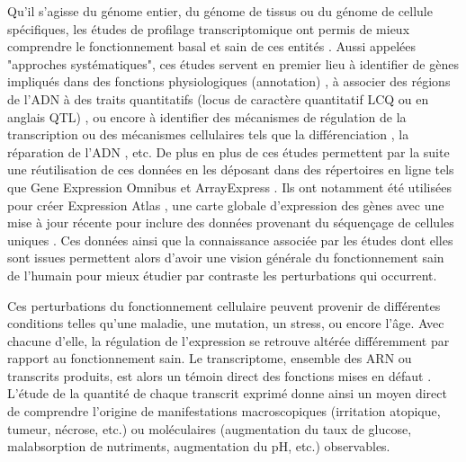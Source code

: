 Qu'il s'agisse du génome entier, du génome de tissus ou du génome de cellule spécifiques, les études de profilage transcriptomique ont permis de mieux comprendre le fonctionnement basal et sain de ces entités \cite{Hughes2000, Cloonan2008Jul}. Aussi appelées "approches systématiques", ces études servent en premier lieu à identifier de gènes impliqués dans des fonctions physiologiques (annotation) \cite{Munji2019Nov}, à associer des régions de l'ADN à des traits quantitatifs (locus de caractère quantitatif LCQ ou en anglais QTL) \cite{Sarkar2019Apr}, ou encore à identifier des mécanismes de régulation de la transcription \cite{Segales2016Dec} ou des mécanismes cellulaires tels que la différenciation \cite{Godoy2018Jul}, la réparation de l'ADN \cite{Jividen2018Dec}, etc. De plus en plus de ces études permettent par la suite une réutilisation de ces données en les déposant dans des répertoires en ligne tels que Gene Expression Omnibus \cite{Barrett2013Jan} et ArrayExpress \cite{Athar2019Jan}. Ils ont notamment été utilisées pour créer Expression Atlas \cite{Lukk2010Apr}, une carte globale d'expression des gènes avec une mise à jour récente pour inclure des données provenant du séquençage de cellules uniques \cite{Papatheodorou2020Jan}. Ces données ainsi que la connaissance associée par les études dont elles sont issues permettent alors d'avoir une vision générale du fonctionnement sain de l'humain pour mieux étudier par contraste les perturbations qui occurrent.

Ces perturbations du fonctionnement cellulaire peuvent provenir de différentes conditions telles qu'une maladie, une mutation, un stress, ou encore l'âge. Avec chacune d'elle, la régulation de l'expression se retrouve altérée différemment par rapport au fonctionnement sain. Le transcriptome, ensemble des ARN ou transcrits produits, est alors un témoin direct des fonctions mises en défaut \cite{Morozova2009Aug}. L'étude de la quantité de chaque transcrit exprimé donne ainsi un moyen direct de comprendre l'origine de manifestations macroscopiques (irritation atopique, tumeur, nécrose, etc.) ou moléculaires (augmentation du taux de glucose, malabsorption de nutriments, augmentation du pH, etc.) observables.



